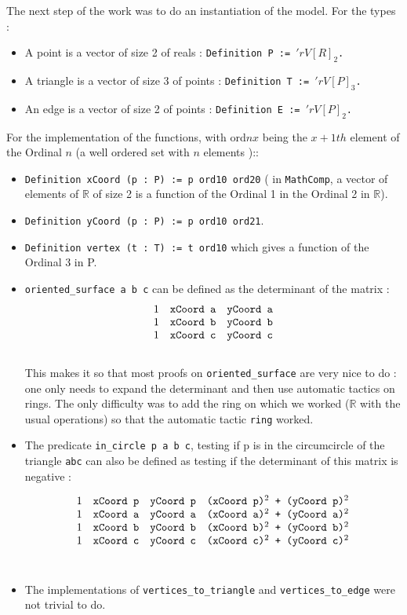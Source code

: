 \documentclass[a4paper,10pt]{article}
\begin{document}
The next step of the work was to do an instantiation of the model. For the types :
\begin{itemize}
\item A point is a vector of size 2 of reals : {\tt Definition P := $'rV[R]_2$. }
\item A triangle is a vector of size 3 of points : {\tt Definition T := $'rV[P]_3$. }
\item An edge is a vector of size 2 of points : {\tt Definition E := $'rV[P]_2$. }
\end{itemize}
For the implementation of the functions, with ord$nx$ being the $x+1{th}$ element of the Ordinal $n$ (a well ordered set with $n$ elements )::
 \begin{itemize}
  \item {\tt Definition xCoord (p : P) := p ord10 ord20} ( in {\tt MathComp}, a vector of elements of $\mathbb{R}$ of size 2 is a function of the Ordinal 1 in the Ordinal 2 in $\mathbb{R}$). 
  \item {\tt Definition yCoord (p : P) := p ord10 ord21}.
   \item {\tt Definition vertex (t : T) := t ord10} which gives a function of the Ordinal 3 in P.
\item {\tt oriented\_surface a b c} can be defined as the determinant of the matrix :
  $$\begin{matrix}
1 & \text{{\tt xCoord  a}} & \text{{\tt yCoord  a}}\\
1 & \text{{\tt xCoord  b}} & \text{{\tt yCoord  b}}\\
1 & \text{{\tt xCoord  c}} & \text{{\tt yCoord  c}}
\end{matrix}$$\\
This makes it so that most proofs on {\tt oriented\_surface} are very nice to do : one only needs to expand the determinant and then use automatic tactics on rings. The only difficulty was to add the ring on which we worked ($\mathbb{R}$ with the usual operations) so that the automatic tactic {\tt ring} worked.

\item The predicate {\tt in\_circle p a b c}, testing if p is in the circumcircle of the triangle {\tt abc} can also be defined as testing if the determinant of this matrix is negative :

  $$\begin{matrix}
1 & \text{{\tt xCoord  p}} & \text{{\tt yCoord  p}}& \text{{\tt (xCoord  p)$^2$ + (yCoord  p)$^2$}}\\
1 & \text{{\tt xCoord  a}} & \text{{\tt yCoord  a}}& \text{{\tt (xCoord  a)$^2$ + (yCoord  a)$^2$}}\\
1 & \text{{\tt xCoord  b}} & \text{{\tt yCoord  b}}& \text{{\tt (xCoord  b)$^2$ + (yCoord  b)$^2$}}\\
1 & \text{{\tt xCoord  c}} & \text{{\tt yCoord  c}}& \text{{\tt (xCoord  c)$^2$ + (yCoord  c)$^2$}}
\end{matrix}$$\\
\item The implementations of {\tt vertices\_to\_triangle} and {\tt vertices\_to\_edge} were not trivial to do.


\end{itemize}
\end{document}
